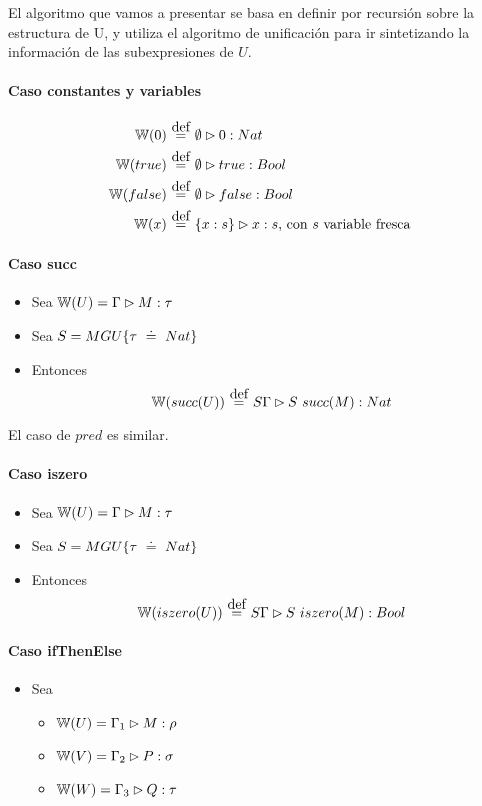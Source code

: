 El algoritmo que vamos a presentar se basa en definir  por recursión sobre la estructura de U, y utiliza el algoritmo de unificación para ir sintetizando la información de las subexpresiones de $U$.

\paragraph{Caso constantes y variables}

\begin{align*}
  \w{0} &\eqdef \emptyset \rhd 0 : Nat \\
  \w{true} &\eqdef \emptyset \rhd true : Bool \\
  \w{false} &\eqdef \emptyset \rhd false : Bool \\
  \w{x} &\eqdef \{x:s\} \rhd x : s \text{, con $s$ variable fresca} \\
\end{align*}

\paragraph{Caso succ}

\begin{itemize}
  \item Sea $\mathbb{W}(U) = \Gamma \rhd M : \tau$
  \item Sea $S = MGU\{\tau \uni Nat\}$
  \item Entonces
  \[\w{succ(U)} \eqdef S\Gamma \rhd S\ succ(M) : Nat\]
\end{itemize}

El caso de $pred$ es similar.

\paragraph{Caso iszero}

\begin{itemize}
  \item Sea $\mathbb{W}(U) = \Gamma \rhd M : \tau$
  \item Sea $S = MGU\{\tau \uni Nat\}$
  \item Entonces
  \[\w{iszero(U)} \eqdef S\Gamma \rhd S\ iszero(M) : Bool\]
\end{itemize}

\paragraph{Caso ifThenElse}

\begin{itemize}
  \item Sea
    \begin{itemize}
      \item $\mathbb{W}(U) = \Gamma_1 \rhd M : \rho$
      \item $\mathbb{W}(V) = \Gamma_2 \rhd P : \sigma$
      \item $\mathbb{W}(W) = \Gamma_3 \rhd Q : \tau$
    \end{itemize}
\end{itemize}


